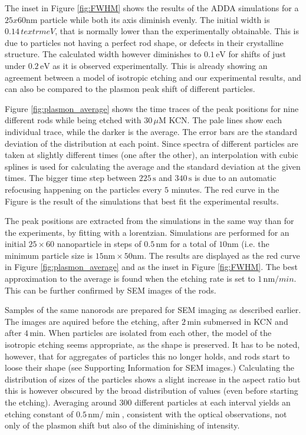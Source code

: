 \documentclass[twocolumn]{article}
\begin{document}
The inset in Figure \ref{fig:FWHM} shows the results of the
ADDA\cite{Yurkin2011} simulations for a $25x60$nm particle while both its axis
diminish evenly. The initial width is $0.14\,textrm{eV}$, that is normally lower
than the experimentally obtainable. This is due to particles not having a
perfect rod shape, or defects in their crystalline structure. The calculated
width however diminishes to $0.1\,\textrm{eV}$ for shifts of just under
$0.2\,\textrm{eV}$ as it is observed experimentally. This is already showing an
agreement between a model of isotropic etching and our experimental results, and
can also be compared to the plasmon peak shift of different particles.

Figure \ref{fig:plasmon_average} shows the time traces of the peak positions for
nine different rods while being etched with $30\,\mu\textrm{M}$ KCN. The pale
lines show each individual trace, while the darker is the average.
The error bars are the standard deviation of the distribution at each point.
Since spectra of different particles are taken at slightly different times (one
after the other), an interpolation with cubic splines is used for calculating
the average and the standard deviation at the given times. The bigger time step
between $225\,\textrm{s}$ and $340\,\textrm{s}$ is due to an automatic
refocusing happening on the particles every $5$ minutes. The red curve in the
Figure is the result of the simulations that best fit the experimental results.

The peak positions are extracted from the simulations in the same way
than for the experiments, by fitting with a lorentzian. Simulations are
performed for an initial $25\times60$ nanoparticle in steps of
$0.5\,\textrm{nm}$ for a total of $10\textrm{nm}$ (i.e. the minimum particle
size is $15\textrm{nm}\times 50 \textrm{nm}$. The results are displayed as the
red curve in Figure \ref{fig:plasmon_average} and as the inset in Figure
\ref{fig:FWHM}. The best approximation to the average is found when the etching
rate is set to $1\,\textrm{nm}/min$. This can be further confirmed by SEM images
of the rods. 

Samples of the same nanorods are prepared for SEM imaging as described earlier.
The images are aquired before the etching, after $2\,\textrm{min}$ submersed in
KCN and after $4\,\textrm{min}$. When particles are isolated from each other,
the model of the isotropic etching seems appropriate, as the shape is preserved.
It has to be noted, however, that for aggregates of particles this no longer
holds, and rods start to loose their shape (see Supporting Information for SEM
images.) Calculating the distribution of sizes of the particles shows a slight
increase in the aspect ratio but this is however obscured by the broad
distribution of values (even before starting the etching). Averaging around
$300$ different particles at each interval yields an etching constant of
$0.5\,\textrm{nm}/\min$, consistent with the optical observations, not only of
the plasmon shift but also of the diminishing of intensity. 
\end{document}
